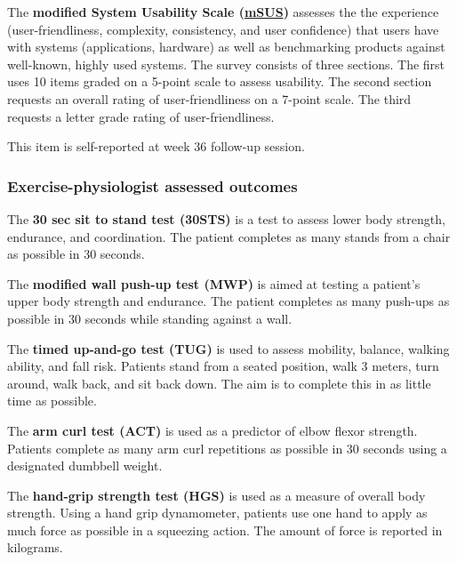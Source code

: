 \documentclass[
]{article}
\begin{document}
\label{outcome:msus}
The \textbf{modified System Usability Scale (\hyperref[analysis:msus]{mSUS})} assesses the the experience (user-friendliness, complexity, consistency, and user confidence) that users have with systems (applications, hardware) as well as benchmarking products against well-known, highly used systems.
The survey consists of three sections.
The first uses 10 items graded on a 5-point scale to assess usability.
The second section requests an overall rating of user-friendliness on a 7-point scale.
The third requests a letter grade rating of user-friendliness.

This item is self-reported at week 36 follow-up session.


\hypertarget{epa-outcomes}{
\subsubsection{Exercise-physiologist assessed outcomes}\label{epa-outcomes}}

\label{outcome:30sts}
The \textbf{30 sec sit to stand test (30STS)} \cites{rikli1999development}{jones199930}{macfarlane2006validity} is a test to assess lower body strength, endurance, and coordination.
The patient completes as many stands from a chair as possible in 30 seconds.

\label{outcome:mwp}
The \textbf{modified wall push-up test (MWP)} is aimed at testing a patient’s upper body strength and endurance. 
The patient completes as many push-ups as possible in 30 seconds while standing against a wall. 

\label{outcome:tug}
The \textbf{timed up-and-go test (TUG)} \cites{podsiadlo1991timed}{shumway2000predicting} is used to assess mobility, balance, walking ability, and fall risk.
Patients stand from a seated position, walk 3 meters, turn around, walk back, and sit back down. 
The aim is to complete this in as little time as possible.

\label{outcome:act}
The \textbf{arm curl test (ACT)} \cites{rikli1999development}{liu2017predicting} is used as a predictor of elbow flexor strength. 
Patients complete as many arm curl repetitions as possible in 30 seconds using a designated dumbbell weight.

\label{outcome:hgs}
The \textbf{hand-grip strength test (HGS)} \cite{liu2017predicting} is used as a measure of overall body strength.
Using a hand grip dynamometer, patients use one hand to apply as much force as possible in a squeezing action.
The amount of force is reported in kilograms.
\end{document}
